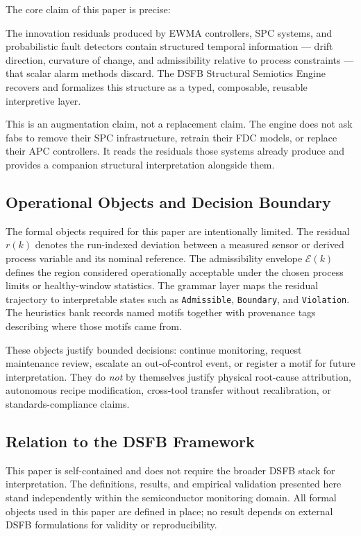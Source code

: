 \documentclass[11pt,letterpaper]{article}
\theoremstyle{scresult}
\begin{document}
The core claim of this paper is precise:

\begin{tcolorbox}[claimbox]
The innovation residuals produced by EWMA controllers, SPC systems, and
probabilistic fault detectors contain structured temporal information --- drift
direction, curvature of change, and admissibility relative to process
constraints --- that scalar alarm methods discard. The DSFB Structural Semiotics
Engine recovers and formalizes this structure as a typed, composable,
reusable interpretive layer.
\end{tcolorbox}

This is an augmentation claim, not a replacement claim. The engine does not
ask fabs to remove their SPC infrastructure, retrain their FDC models, or
replace their APC controllers. It reads the residuals those systems already
produce and provides a companion structural interpretation alongside them.

\subsection{Operational Objects and Decision Boundary}

The formal objects required for this paper are intentionally limited. The
residual $r(k)$ denotes the run-indexed deviation between a measured sensor or
derived process variable and its nominal reference. The admissibility envelope
$\mathcal{E}(k)$ defines the region considered operationally acceptable under
the chosen process limits or healthy-window statistics. The grammar layer maps
the residual trajectory to interpretable states such as \texttt{Admissible},
\texttt{Boundary}, and \texttt{Violation}. The heuristics bank records named
motifs together with provenance tags describing where those motifs came from.

These objects justify bounded decisions: continue monitoring, request
maintenance review, escalate an out-of-control event, or register a motif for
future interpretation. They do \emph{not} by themselves justify physical
root-cause attribution, autonomous recipe modification, cross-tool transfer
without recalibration, or standards-compliance claims.

\subsection{Relation to the DSFB Framework}

This paper is self-contained and does not require the broader DSFB stack for
interpretation. The definitions, results, and empirical validation presented
here stand independently within the semiconductor monitoring domain. All formal
objects used in this paper are defined in place; no result depends on external
DSFB formulations for validity or reproducibility.
\end{document}
